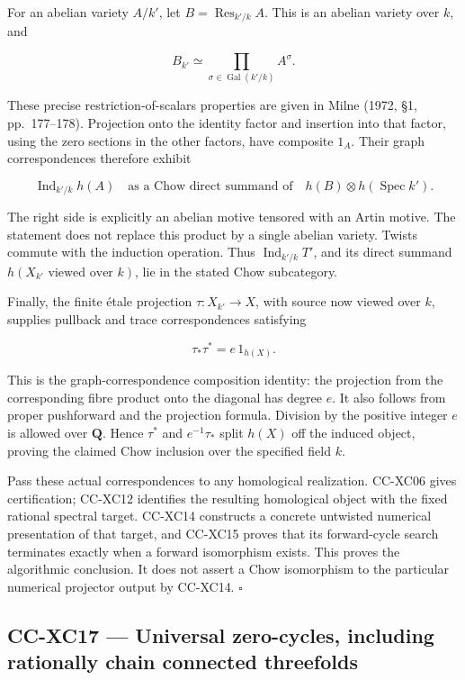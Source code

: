 For an abelian variety \(A/k'\), let \(B=\operatorname{Res}_{k'/k}A\).
This is an abelian variety over \(k\), and

\[
 B_{k'}\simeq\prod_{\sigma\in\operatorname{Gal}(k'/k)}A^\sigma .
 \tag{CC-XC.G6}
\]

These precise restriction-of-scalars properties are given in Milne
(1972, §1, pp.~177--178). Projection onto the identity factor and
insertion into that factor, using the zero sections in the other
factors, have composite \(1_A\). Their graph correspondences therefore
exhibit

\[
 \operatorname{Ind}_{k'/k}h(A)
 \quad\text{as a Chow direct summand of}\quad
 h(B)\otimes h(\operatorname{Spec}k').
 \tag{CC-XC.G7}
\]

The right side is explicitly an abelian motive tensored with an Artin
motive. The statement does not replace this product by a single abelian
variety. Twists commute with the induction operation. Thus
\(\operatorname{Ind}_{k'/k}T'\), and its direct summand
\(h(X_{k'}\text{ viewed over }k)\), lie in the stated Chow subcategory.

Finally, the finite étale projection \(\tau:X_{k'}\to X\), with source
now viewed over \(k\), supplies pullback and trace correspondences
satisfying

\[
                         \tau_*\tau^*=e\,1_{h(X)} .
 \tag{CC-XC.G8}
\]

This is the graph-correspondence composition identity: the projection
from the corresponding fibre product onto the diagonal has degree \(e\).
It also follows from proper pushforward and the projection formula.
Division by the positive integer \(e\) is allowed over \(\mathbf Q\).
Hence \(\tau^*\) and \(e^{-1}\tau_*\) split \(h(X)\) off the induced
object, proving the claimed Chow inclusion over the specified field
\(k\).

Pass these actual correspondences to any homological realization.
CC-XC06 gives certification; CC-XC12 identifies the resulting
homological object with the fixed rational spectral target. CC-XC14
constructs a concrete untwisted numerical presentation of that target,
and CC-XC15 proves that its forward-cycle search terminates exactly when
a forward isomorphism exists. This proves the algorithmic conclusion. It
does not assert a Chow isomorphism to the particular numerical projector
output by CC-XC14. \(\square\)

\subsection{CC-XC17 --- Universal zero-cycles, including rationally
chain connected
threefolds}\label{cc-xc17-universal-zero-cycles-including-rationally-chain-connected-threefolds}

